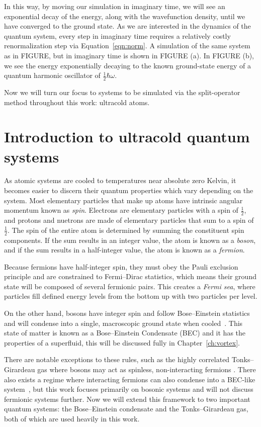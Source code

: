 \noindent In this way, by moving our simulation in imaginary time, we will see an exponential decay of the energy, along with the wavefunction density, until we have converged to the ground state.
As we are interested in the dynamics of the quantum system, every step in imaginary time requires a relatively costly renormalization step via Equation~\ref{eqn:norm}.
A simulation of the same system as in FIGURE, but in imaginary time is shown in FIGURE (a).
In FIGURE (b), we see the energy exponentially decaying to the known ground-state energy of a quantum harmonic oscillator of $\frac{1}{2}\hbar\omega$.

Now we will turn our focus to systems to be simulated via the split-operator method throughout this work: ultracold atoms.

\section{Introduction to ultracold quantum systems}

As atomic systems are cooled to temperatures near absolute zero Kelvin, it becomes easier to discern their quantum properties which vary depending on the system.
Most elementary particles that make up atoms have intrinsic angular momentum known as \textit{spin}.
Electrons are elementary particles with a spin of $\frac{1}{2}$, and protons and nuetrons are made of elementary particles that sum to a spin of $\frac{1}{2}$.
The spin of the entire atom is determined by summing the constituent spin components.
If the sum results in an integer value, the atom is known as a \textit{boson}, and if the sum results in a half-integer value, the atom is known as a \textit{fermion}.

Because fermions have half-integer spin, they must obey the Pauli exclusion principle and are constrained to Fermi--Dirac statistics, which means their ground state will be composed of several fermionic pairs.
This creates a \textit{Fermi sea}, where particles fill defined energy levels from the bottom up with two particles per level.

On the other hand, bosons have integer spin and follow Bose--Einstein statistics and will condense into a single, macroscopic ground state when cooled~\cite{Einstein1925, Fetter2003}.
This state of matter is known as a Bose--Einstein Condensate (BEC) and it has the properties of a superfluid, this will be discussed fully in Chapter~\ref{ch:vortex}.

There are notable exceptions to these rules, such as the highly correlated Tonks--Girardeau gas where bosons may act as spinless, non-interacting fermions \cite{Girardeau}.
There also exists a regime where interacting fermions can also condense into a BEC-like system~\cite{Nozieres1985, Bulgac2014}, but this work focuses primarily on bosonic systems and will not discuss fermionic systems further.
Now we will extend this framework to two important quantum systems: the Bose--Einstein condensate and the Tonks--Girardeau gas, both of which are used heavily in this work.


